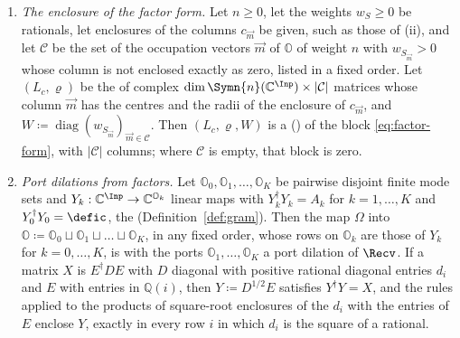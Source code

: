 \begin{theorem}
\begin{enumerate}[label=(\roman*),leftmargin=3.0em]
  every entry of every $c_{\vec m}$. An entry so enclosed is exact where every
  enclosure it is computed from is exact, and it is enclosed exactly as $0$
  where every term of the permanent, a product of entries of $\Omega$, has a
  factor enclosed exactly as $0$; in particular every entry of $c_{\vec m}$
  is, where $\vec m$ has a photon in a mode whose row is enclosed exactly as
  zero.
\item \emph{The enclosure of the factor form.} Let $n\ge0$, let the weights $w_S\ge0$ be
  rationals, let enclosures of the columns $c_{\vec m}$ be given, such as
  those of (ii), and let $\mathcal{C}$ be the set of the occupation vectors
  $\vec m$ of $\mathbb{O}$ of weight $n$ with $w_{S_{\vec m}}>0$ whose column
  is not enclosed exactly as zero, listed in a fixed order. Let $(L_c,\varrho)$
  be the  of complex
  $\dim\Symn{n}(\mathbb{C}^{\Inp})\times|\mathcal{C}|$ matrices whose column
  $\vec m$ has the centres and the radii of the enclosure of $c_{\vec m}$,
  and $W\coloneqq\operatorname{diag}(w_{S_{\vec m}})_{\vec m\in\mathcal{C}}$.
  Then $(L_c,\varrho,W)$ is a 
  () of the block
  \eqref{eq:factor-form}, with $|\mathcal{C}|$ columns; where $\mathcal{C}$
  is empty, that block is zero.
\item \emph{Port dilations from factors.} Let
  $\mathbb{O}_0,\mathbb{O}_1,\dots,\mathbb{O}_K$ be pairwise disjoint finite
  mode sets and $Y_k:\mathbb{C}^{\Inp}\to\mathbb{C}^{\mathbb{O}_k}$ linear
  maps with $Y_k^{\dagger}Y_k=A_k$ for $k=1,\dots,K$ and
  $Y_0^{\dagger}Y_0=\defic$, the 
  (Definition~\ref{def:gram}). Then the map $\Omega$ into
  $\mathbb{O}\coloneqq\mathbb{O}_0\sqcup\mathbb{O}_1\sqcup\dots\sqcup\mathbb{O}_K$,
  in any fixed order, whose rows on $\mathbb{O}_k$ are those of $Y_k$ for
  $k=0,\dots,K$, is with the ports $\mathbb{O}_1,\dots,\mathbb{O}_K$ a port
  dilation of $\Recv$. If a matrix $X$ is $E^{\dagger}DE$ with $D$ diagonal with
  positive rational diagonal entries $d_i$ and $E$ with entries in
  $\mathbb{Q}(i)$, then $Y\coloneqq D^{1/2}E$ satisfies $Y^{\dagger}Y=X$, and
  the rules applied to the products of square-root enclosures of the $d_i$
  with the entries of $E$ enclose $Y$, exactly in every row $i$ in which
  $d_i$ is the square of a rational.
\end{enumerate}
\end{theorem}

